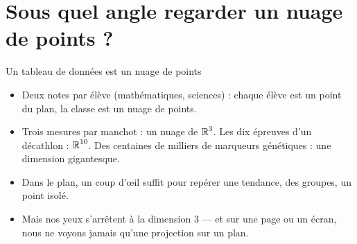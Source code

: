 \section{Sous quel angle regarder un nuage de points ?}

\begin{frame}{Un tableau de données est un nuage de points}
  \begin{itemize}
    \item Deux notes par élève (mathématiques, sciences) : chaque élève est
      un point du plan, la classe est un nuage de points.
    \item Trois mesures par manchot : un nuage de $\operatorname{\mathbb{R}}^3$. Les dix épreuves
      d'un décathlon : $\operatorname{\mathbb{R}}^{10}$. Des centaines de milliers de marqueurs
      génétiques : une dimension gigantesque.
    \item Dans le plan, un coup d'œil suffit pour repérer une tendance, des
      groupes, un point isolé.
    \item Mais nos yeux s'arrêtent à la dimension $3$ --- et sur une page ou
      un écran, nous ne voyons jamais qu'une projection sur un plan.
  \end{itemize}
\end{frame}

